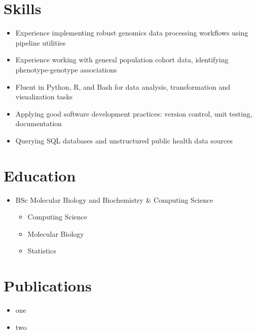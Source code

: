 \documentclass{article}
\begin{document}
\section{Skills}
\begin{itemize}
  \item Experience implementing robust genomics data processing workflows using pipeline utilities
  \item Experience working with general population cohort data, identifying phenotype-genotype associations
  \item Fluent in Python, R, and Bash for data analysis, transformation and visualization tasks
  \item Applying good software development practices: version control, unit testing, documentation
  \item Querying SQL databases and unstructured public health data sources
\end{itemize}

\section{Education}
\begin{itemize}
  \item BSc Molecular Biology and Biochemistry \& Computing Science
    \begin{itemize}
      \item Computing Science
      \item Molecular Biology
      \item Statistics
    \end{itemize}
\end{itemize}

\section{Publications}
\begin{itemize}
  \item one
  \item two
\end{itemize}
\end{document}
